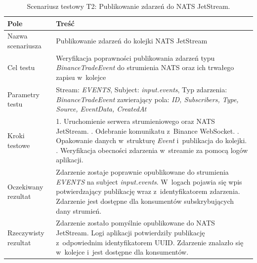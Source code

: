 \begin{table}[H]
    \centering
    \caption{Scenariusz testowy T2: Publikowanie zdarzeń do NATS JetStream.}
    \label{tab:test_nats_publish}
    \begin{tabular}{|p{}|p{}|}
        \hline
        \textbf{Pole}        & \textbf{Treść}                                                                                                                                                                                                                                                                        \\ \hline
        Nazwa scenariusza    & Publikowanie zdarzeń do kolejki NATS JetStream                                                                                                                                                                                                                                        \\ \hline
        Cel testu            & Weryfikacja poprawności publikowania zdarzeń typu \textit{BinanceTradeEvent} do strumienia NATS oraz ich trwałego zapisu w~kolejce                                                                                                                                                    \\ \hline
        Parametry testu      & Stream: \textit{EVENTS}, Subject: \textit{input.events}, Typ zdarzenia: \textit{BinanceTradeEvent} zawierający pola: \textit{ID, Subscribers, Type, Source, EventData, CreatedAt}                                                                                                     \\ \hline
        Kroki testowe        & 1. Uruchomienie serwera strumieniowego oraz NATS JetStream. \newline 2. Odebranie komunikatu z~Binance WebSocket. \newline 3. Opakowanie danych w~strukturę \textit{Event} i~publikacja do kolejki. \newline 4. Weryfikacja obecności zdarzenia w~streamie za pomocą logów aplikacji. \\ \hline
        Oczekiwany rezultat  & Zdarzenie zostaje poprawnie opublikowane do strumienia \textit{EVENTS} na subject \textit{input.events}. W~logach pojawia się wpis potwierdzający publikację wraz z~identyfikatorem zdarzenia. Zdarzenie jest dostępne dla konsumentów subskrybujących dany strumień.                 \\ \hline
        Rzeczywisty rezultat & Zdarzenie zostało pomyślnie opublikowane do NATS JetStream. Logi aplikacji potwierdziły publikację z~odpowiednim identyfikatorem UUID\@. Zdarzenie znalazło się w~kolejce i~jest dostępne dla konsumentów.                                                                            \\ \hline
    \end{tabular}
\end{table}

